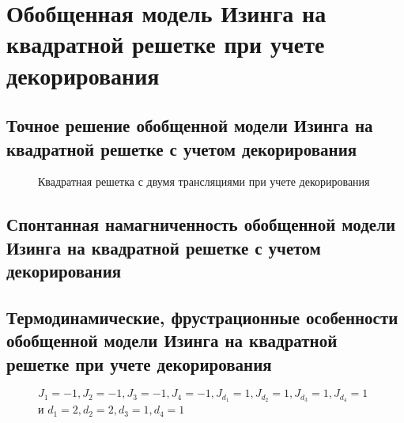 \chapter{Обобщенная модель Изинга на квадратной решетке при учете декорирования}\label{ch:ch6}


\section{Точное решение обобщенной модели Изинга на квадратной решетке с учетом декорирования}

 \begin{figure}[h]
	\caption{Квадратная решетка с двумя трансляциями при учете декорирования}
	\label{squareDecor}
\end{figure}

\section{Спонтанная намагниченность обобщенной модели Изинга на квадратной решетке с учетом декорирования}



\section{Термодинамические, фрустрационные особенности обобщенной модели Изинга на квадратной решетке при учете декорирования}

 \begin{figure}[h]
	\begin{minipage}{0.47\linewidth}
	\end{minipage}
	\hfill
	\begin{minipage}{0.47\linewidth}
	\end{minipage}
	\caption{$J_1 = -1, J_2 = -1, J_3 = -1, J_4 = -1, J_{d_1} = 1, J_{d_2} = 1, J_{d_3} = 1, J_{d_4} = 1$ и $d_1 = 2, d_2 = 2, d_3 = 1, d_4 = 1$}
	\label{0trans}
\end{figure}

